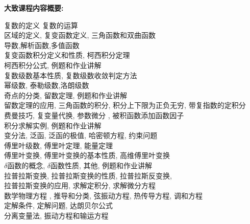 \documentclass[11pt, a4paper]{article}
\begin{document}
\noindent \textbf{大致课程内容概要:}
\begin{center} 
\begin{minipage}{5in}
\begin{flushleft}
{\color{darkgreen}{\Rectangle}} 复数的定义
复数的运算 	
\\
{\color{darkgreen}{\Rectangle}} 区域的定义, 复变函数定义, 三角函数和双曲函数
\\
{\color{darkgreen}{\Rectangle}}
导数,解析函数,多值函数 
\\
{\color{red}{\Rectangle}}
复变函数积分定义和性质, 柯西积分定理  
\\
{\color{darkgreen}{\Rectangle}}
柯西积分公式,
例题和作业讲解 
\\
{\color{darkgreen}{\Rectangle}}
复数级数基本性质,
复数级数收敛判定方法
\\
{\color{red}{\Rectangle}}
幂级数,
泰勒级数,洛朗级数
\\
{\color{darkgreen}{\Rectangle}}
奇点的分类,
留数定理,
例题和作业讲解  
\\
{\color{red}{\Rectangle}}
留数定理的应用, 三角函数的积分,
积分上下限为正负无穷,
带复指数的定积分  
\\
{\color{darkgreen}{\Rectangle}}
费曼技巧,
复变量代换,
参数微分 ,
被积函数添加函数因子
\\
{\color{darkgreen}{\Rectangle}}
积分求解实例,
例题和作业讲解 
\\
{\color{darkgreen}{\Rectangle}}
变分法,
泛函,
泛函的极值,
哈密顿方程,
约束问题
\\
{\color{red}{\Rectangle}}
傅里叶级数,
傅里叶定理,
能量定理
\\
{\color{red}{\Rectangle}}
傅里叶变换,
傅里叶变换的基本性质,
高维傅里叶变换
\\
{\color{darkgreen}{\Rectangle}}
$\delta$函数的概念,
$\delta$函数性质,
其他,
例题和作业讲解
\\
{\color{darkgreen}{\Rectangle}}
拉普拉斯变换,
拉普拉斯变换的性质,
拉普拉斯反变换,
\\
{\color{darkgreen}{\Rectangle}}
拉普拉斯变换的应用,
求解定积分,
求解微分方程
\\
{\color{darkgreen}{\Rectangle}}
数学物理方程 ,
推导和分类,
弦振动方程,
热传导方程,
调和方程
\\
{\color{red}{\Rectangle}}
定解条件,
定解问题,
达朗贝尔公式
\\
{\color{red}{\Rectangle}}
分离变量法,
振动方程和输运方程
\\
{\color{darkgreen}{\Rectangle}}

\end{flushleft}
\end{minipage}
\end{center}
\end{document}
